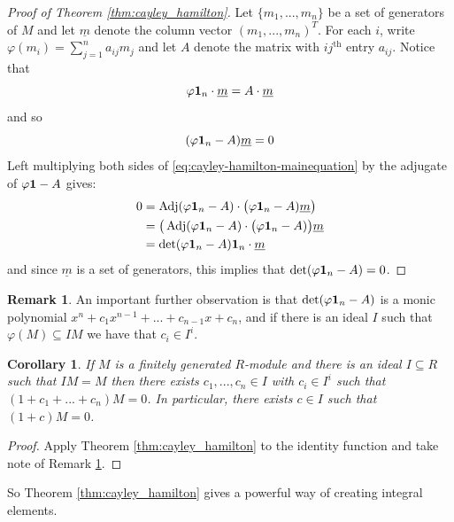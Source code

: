 \documentclass[12pt]{article}
\theoremstyle{plain}
\newtheorem{cor}[thm]{Corollary}
\theoremstyle{definition}
\newtheorem{remark}[thm]{Remark}
\begin{document}
\begin{proof}[Proof of Theorem \ref{thm:cayley_hamilton}]
Let $\lbrace m_1,...,m_n\rbrace$ be a set of generators of $M$ and let $\underline{m}$ denote the column vector $(m_1,...,m_n)^T$. For each $i$, write $\varphi(m_i) = \sum_{j = 1}^n a_{ij}m_j$ and let $A$ denote the matrix with $ij^\text{th}$ entry $a_{ij}$. Notice that
\begin{equation}
    \varphi \bold{1}_n\cdot \underline{m} = A\cdot \underline{m}
\end{equation}
and so
\begin{equation}\label{eq:cayley-hamilton-mainequation}
    (\varphi \bold{1}_n - A) \underline{m} = 0
\end{equation}
Left multiplying both sides of \eqref{eq:cayley-hamilton-mainequation} by the adjugate of $\varphi\bold{1} - A$ gives:
\begin{align*}
    0 &= \operatorname{Adj}(\varphi \bold{1}_n - A)\cdot \big(\varphi \bold{1}_n - A)\underline{m}\big)\\
    &= \big(\operatorname{Adj}(\varphi \bold{1}_n - A)\cdot \big(\varphi \bold{1}_n - A)\big)\underline{m}\\
    &= \operatorname{det}(\varphi \bold{1}_n - A)\bold{1}_n \cdot \underline{m}
\end{align*}
and since $\underline{m}$ is a set of generators, this implies that $\operatorname{det}(\varphi \bold{1}_n - A) = 0$.
\end{proof}
\begin{remark}
\label{remark:rest_of_CHT}
An important further observation is that $\operatorname{det}(\varphi\bold{1}_n - A)$ is a monic polynomial $x^n + c_1x^{n-1} + ... + c_{n-1}x + c_n$, and if there is an ideal $I$ such that $\varphi(M) \subseteq IM$ we have that $c_i \in I^i$.
\end{remark}
\begin{cor}
\label{cor:cayley_helpful_cor} If $M$ is a finitely generated $R$-module and there is an ideal $I \subseteq R$ such that $IM = M$ then there exists $c_1,...,c_n \in I$ with $c_i \in I^i$ such that $(1 + c_1 + ... + c_n)M = 0$. In particular, there exists $c \in I$ such that $(1 + c)M = 0$.
\end{cor}
\begin{proof}
Apply Theorem \ref{thm:cayley_hamilton} to the identity function and take note of Remark \ref{remark:rest_of_CHT}.
\end{proof}
So Theorem \ref{thm:cayley_hamilton} gives a powerful way of creating integral elements.
\end{document}
